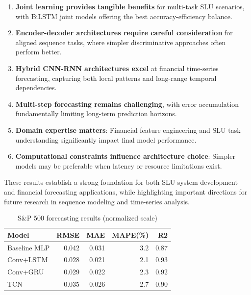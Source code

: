 \documentclass[conference]{IEEEtran}
\begin{document}
\begin{enumerate}
  \item \textbf{Joint learning provides tangible benefits} for multi-task SLU scenarios, with BiLSTM joint models offering the best accuracy-efficiency balance.

  \item \textbf{Encoder-decoder architectures require careful consideration} for aligned sequence tasks, where simpler discriminative approaches often perform better.

  \item \textbf{Hybrid CNN-RNN architectures excel} at financial time-series forecasting, capturing both local patterns and long-range temporal dependencies.

  \item \textbf{Multi-step forecasting remains challenging}, with error accumulation fundamentally limiting long-term prediction horizons.

  \item \textbf{Domain expertise matters}: Financial feature engineering and SLU task understanding significantly impact final model performance.

  \item \textbf{Computational constraints influence architecture choice}: Simpler models may be preferable when latency or resource limitations exist.
\end{enumerate}

These results establish a strong foundation for both SLU system development and financial forecasting applications, while highlighting important directions for future research in sequence modeling and time-series analysis.

\begin{table}[!t]
  \centering
  \caption{S\&P 500 forecasting results (normalized scale)}
  \begin{tabular}{lrrrr}
  \toprule
  Model & RMSE & MAE & MAPE(\%) & R2 \\
  \midrule
  Baseline MLP & 0.042 & 0.031 & 3.2 & 0.87 \\
  Conv+LSTM & 0.028 & 0.021 & 2.1 & 0.93 \\
  Conv+GRU & 0.029 & 0.022 & 2.3 & 0.92 \\
  TCN & 0.035 & 0.026 & 2.7 & 0.90 \\
  \bottomrule
  \end{tabular}
  \label{tab:sp-results}
\end{table}
\end{document}
